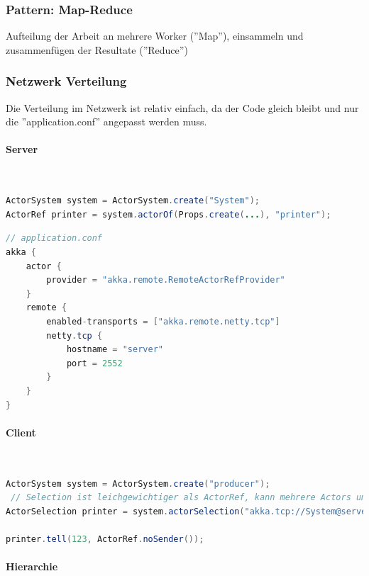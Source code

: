 \subsubsection{Pattern: Map-Reduce}

Aufteilung der Arbeit an mehrere Worker (''Map''), einsammeln und zusammenfügen der Resultate (''Reduce'')

\subsubsection{Netzwerk Verteilung}
Die Verteilung im Netzwerk ist relativ einfach, da der Code gleich bleibt und nur die ''application.conf'' angepasst werden muss.

\paragraph{Server} \hfill \\
\begin{lstlisting}[language=java]
ActorSystem system = ActorSystem.create("System");
ActorRef printer = system.actorOf(Props.create(...), "printer");
\end{lstlisting}

\begin{lstlisting}[language=java]
// application.conf
akka {
	actor {
		provider = "akka.remote.RemoteActorRefProvider"
	}
	remote {
		enabled-transports = ["akka.remote.netty.tcp"]
		netty.tcp {
			hostname = "server"
			port = 2552
		}
	}
}
\end{lstlisting}

\paragraph{Client} \hfill \\
\begin{lstlisting}[language=java]
ActorSystem system = ActorSystem.create("producer");
 // Selection ist leichgewichtiger als ActorRef, kann mehrere Actors umfassen
ActorSelection printer = system.actorSelection("akka.tcp://System@server:2552/user/printer");

printer.tell(123, ActorRef.noSender());
\end{lstlisting}

\paragraph{Hierarchie} \hfill \\

